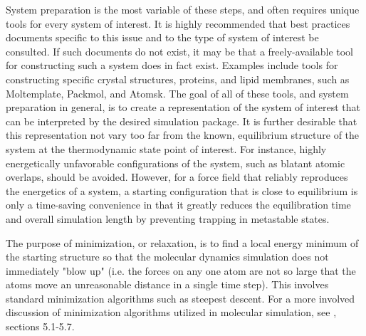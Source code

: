\documentclass[9pt,bestpractices]{livecoms}
\begin{document}
System preparation is the most variable of these steps, and often requires unique tools for every system of interest.
It is highly recommended that best practices documents specific to this issue and to the type of system of interest be consulted.
If such documents do not exist, it may be that a freely-available tool for constructing such a system does in fact exist.
Examples include tools for constructing specific crystal structures, proteins, and lipid membranes, such as Moltemplate, Packmol, and Atomsk.
The goal of all of these tools, and system preparation in general, is to create a representation of the system of interest that can be interpreted by the desired simulation package.
It is further desirable that this representation not vary too far from the known, equilibrium structure of the system at the thermodynamic state point of interest.
For instance, highly energetically unfavorable configurations of the system, such as blatant atomic overlaps, should be avoided.
However, for a force field that reliably reproduces the energetics of a system, a starting configuration that is close to equilibrium is only a time-saving convenience in that it greatly reduces the equilibration time and overall simulation length by preventing trapping in metastable states.

The purpose of minimization, or relaxation, is to find a local energy minimum of the starting structure so that the molecular dynamics simulation does not immediately "blow up" (i.e. the forces on any one atom are not so large that the atoms move an unreasonable distance in a single time step).
This involves standard minimization algorithms such as steepest descent.
For a more involved discussion of minimization algorithms utilized in molecular simulation, see \citet{LeachBook}, sections 5.1-5.7.
\end{document}
